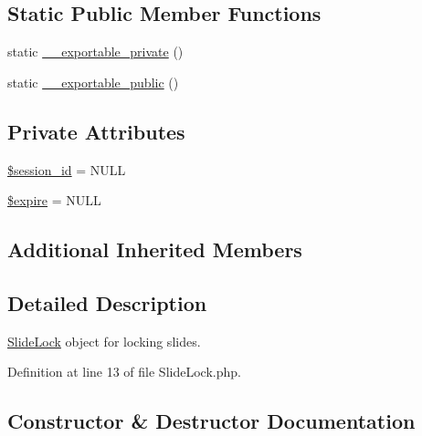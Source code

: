 \subsection*{Static Public Member Functions}
\begin{DoxyCompactItemize}
\item 
static \hyperlink{classlibresignage_1_1common_1_1php_1_1slide_1_1SlideLock_a40c9a0c0845e6ad746be5aba3a4631d9}{\+\_\+\+\_\+exportable\+\_\+private} ()
\item 
static \hyperlink{classlibresignage_1_1common_1_1php_1_1slide_1_1SlideLock_a22546414a97ca4d9dd591164b346544a}{\+\_\+\+\_\+exportable\+\_\+public} ()
\end{DoxyCompactItemize}
\subsection*{Private Attributes}
\begin{DoxyCompactItemize}
\item 
\hyperlink{classlibresignage_1_1common_1_1php_1_1slide_1_1SlideLock_ab12046a6d938f520cdfd107d0ff6f512}{\$session\+\_\+id} = N\+U\+LL
\item 
\hyperlink{classlibresignage_1_1common_1_1php_1_1slide_1_1SlideLock_a2a98a3a7cea4f53e7117ae50ced307c4}{\$expire} = N\+U\+LL
\end{DoxyCompactItemize}
\subsection*{Additional Inherited Members}


\subsection{Detailed Description}
\hyperlink{classlibresignage_1_1common_1_1php_1_1slide_1_1SlideLock}{Slide\+Lock} object for locking slides. 

Definition at line 13 of file Slide\+Lock.\+php.



\subsection{Constructor \& Destructor Documentation}
\mbox{\label{classlibresignage_1_1common_1_1php_1_1slide_1_1SlideLock_aa0d2ffadfe5f362cfea049d2cacad1ac}} 
